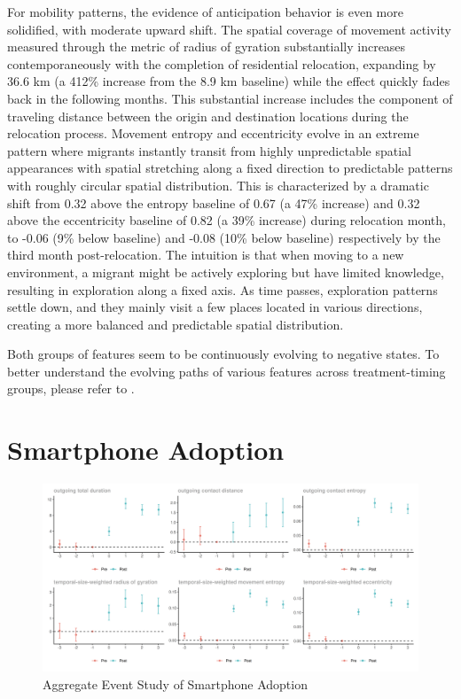For mobility patterns, the evidence of anticipation behavior is even more solidified, with moderate upward shift.
The spatial coverage of movement activity measured through the metric of radius of gyration substantially increases contemporaneously with the completion of residential relocation, expanding by 36.6 km (a 412\% increase from the 8.9 km baseline) while the effect quickly fades back in the following months. This substantial increase includes the component of traveling distance between the origin and destination locations during the relocation process.
Movement entropy and eccentricity evolve in an extreme pattern where migrants instantly transit from highly unpredictable spatial appearances with spatial stretching along a fixed direction to predictable patterns with roughly circular spatial distribution.
This is characterized by a dramatic shift from 0.32 above the entropy baseline of 0.67 (a 47\% increase) and 0.32 above the eccentricity baseline of 0.82 (a 39\% increase) during relocation month, to -0.06 (9\% below baseline) and -0.08 (10\% below baseline) respectively by the third month post-relocation. The intuition is that when moving to a new environment, a migrant might be actively exploring but have limited knowledge, resulting in exploration along a fixed axis. As time passes, exploration patterns settle down, and they mainly visit a few places located in various directions, creating a more balanced and predictable spatial distribution.

Both groups of features seem to be continuously evolving to negative states. To better understand the evolving paths of various features across treatment-timing groups, please refer to .

\section{Smartphone Adoption}
\begin{figure}[h!]
\centering
\caption{Aggregate Event Study of Smartphone Adoption}
\vspace{0.1cm}

\includegraphics[scale=0.49]{figures/csdid/smartphone_adoption.png}

\label{fig:event_study_smartphone_adoption}
\end{figure}

